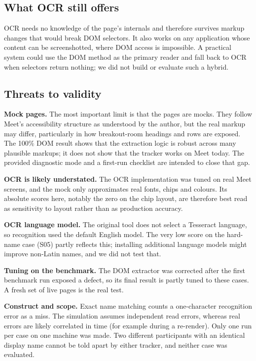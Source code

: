 \documentclass[conference]{IEEEtran}
\begin{document}
\subsection{What OCR still offers}
OCR needs no knowledge of the page's internals and therefore survives markup changes that would break DOM selectors. It also works on any application whose content can be screenshotted, where DOM access is impossible. A practical system could use the DOM method as the primary reader and fall back to OCR when selectors return nothing; we did not build or evaluate such a hybrid.

\subsection{Threats to validity}
\textbf{Mock pages.} The most important limit is that the pages are mocks. They follow Meet's accessibility structure as understood by the author, but the real markup may differ, particularly in how breakout-room headings and rows are exposed. The 100\% DOM result shows that the extraction logic is robust across many plausible markups; it does not show that the tracker works on Meet today. The provided diagnostic mode and a first-run checklist are intended to close that gap.

\textbf{OCR is likely understated.} The OCR implementation was tuned on real Meet screens, and the mock only approximates real fonts, chips and colours. Its absolute scores here, notably the zero on the chip layout, are therefore best read as sensitivity to layout rather than as production accuracy.

\textbf{OCR language model.} The original tool does not select a Tesseract language, so recognition used the default English model. The very low score on the hard-name case (S05) partly reflects this; installing additional language models might improve non-Latin names, and we did not test that.

\textbf{Tuning on the benchmark.} The DOM extractor was corrected after the first benchmark run exposed a defect, so its final result is partly tuned to these cases. A fresh set of live pages is the real test.

\textbf{Construct and scope.} Exact name matching counts a one-character recognition error as a miss. The simulation assumes independent read errors, whereas real errors are likely correlated in time (for example during a re-render). Only one run per case on one machine was made. Two different participants with an identical display name cannot be told apart by either tracker, and neither case was evaluated.
\end{document}
